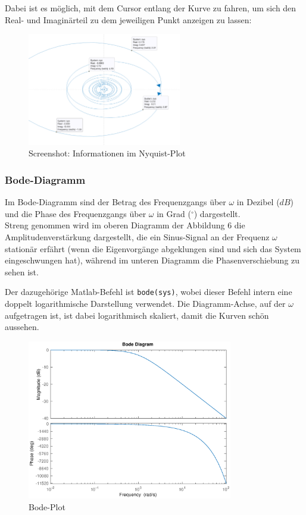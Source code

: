  Dabei ist es möglich, mit dem Cursor entlang der Kurve zu fahren, um sich den Real- und Imaginärteil zu dem jeweiligen Punkt anzeigen zu lassen:
 \begin{figure}[H]
    \label{fig:nyquistCursor}
    \centering
    \includegraphics[width=0.6\textwidth]{Bilder/NyquistCursorPT1Tt.png}
    \caption{Screenshot: Informationen im Nyquist-Plot}
 \end{figure}

 
\subsubsection{Bode-Diagramm}
Im Bode-Diagramm sind der Betrag des Frequenzgangs über $\omega$ in Dezibel ($dB$) und die Phase des Frequenzgangs über $\omega$ in Grad ($^\circ$) dargestellt.\\
Streng genommen wird im oberen Diagramm der Abbildung 6 die Amplitudenverstärkung dargestellt, die ein Sinus-Signal an der Frequenz $\omega$ stationär erfährt (wenn die Eigenvorgänge abgeklungen sind und sich das System eingeschwungen hat), während im unteren Diagramm die Phasenverschiebung zu sehen ist.  

Der dazugehörige Matlab-Befehl ist \texttt{bode(sys)}, wobei dieser Befehl intern eine doppelt logarithmische Darstellung verwendet. Die Diagramm-Achse, auf der $\omega$ aufgetragen ist, ist dabei logarithmisch skaliert, damit die Kurven schön aussehen.

\begin{figure}[H]
    \label{fig:bodePlot}
    \label{fig:lassmich}
    \centering
    \includegraphics[width=0.8\textwidth]{Bilder/BodePT1Tt.eps}
    \caption{Bode-Plot}
 \end{figure}

